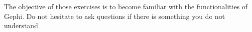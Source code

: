 \documentclass[addpoints]{exam}
\begin{document}
\begin{center}
\end{center}

\vspace{5mm}
\begin{tcolorbox}[colback=black!5!white,colframe=white!75!black]
The objective of those exercises is to become familiar with the functionalities of Gephi. Do not hesitate to ask questions if there is something you do not understand \\  
\end{tcolorbox}
\vspace{5mm}

\end{document}
